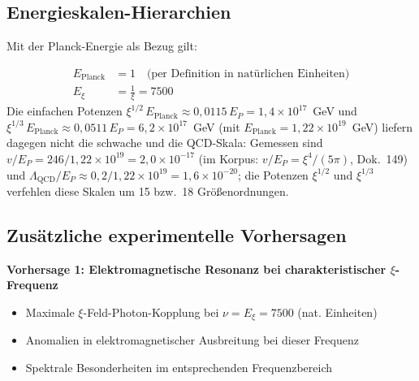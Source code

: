 	\begin{table}[h]
		\centering
		\caption{Dimensionale Konsistenz in natürlichen Einheiten}
	\end{table}
	
	\subsection{Energieskalen-Hierarchien}
	
	Mit der Planck-Energie als Bezug gilt:
	
	\begin{align}
		E_{\text{Planck}} &= 1 \quad \text{(per Definition in natürlichen Einheiten)} \\
		E_\xi &= \frac{1}{\xi} = 7500
	\end{align}
	Die einfachen Potenzen $\xi^{1/2}\,E_{\text{Planck}} \approx 0,0115\,E_P = 1,4 \times 10^{17}$~GeV und $\xi^{1/3}\,E_{\text{Planck}} \approx 0,0511\,E_P = 6,2 \times 10^{17}$~GeV (mit $E_{\text{Planck}} = 1,22 \times 10^{19}$~GeV) liefern dagegen nicht die schwache und die QCD-Skala: Gemessen sind $v/E_P = 246/1,22 \times 10^{19} = 2,0 \times 10^{-17}$ (im Korpus: $v/E_P = \xi^4/(5\pi)$, Dok.~149) und $\Lambda_{\text{QCD}}/E_P \approx 0,2/1,22 \times 10^{19} = 1,6 \times 10^{-20}$; die Potenzen $\xi^{1/2}$ und $\xi^{1/3}$ verfehlen diese Skalen um 15 bzw.\ 18 Größenordnungen.
	
	\subsection{Zusätzliche experimentelle Vorhersagen}
	
	\textbf{Vorhersage 1: Elektromagnetische Resonanz bei charakteristischer $\xi$-Frequenz}
	\begin{itemize}
		\item Maximale $\xi$-Feld-Photon-Kopplung bei $\nu = E_\xi = 7500$ (nat. Einheiten)
		\item Anomalien in elektromagnetischer Ausbreitung bei dieser Frequenz
		\item Spektrale Besonderheiten im entsprechenden Frequenzbereich
	\end{itemize}
	
